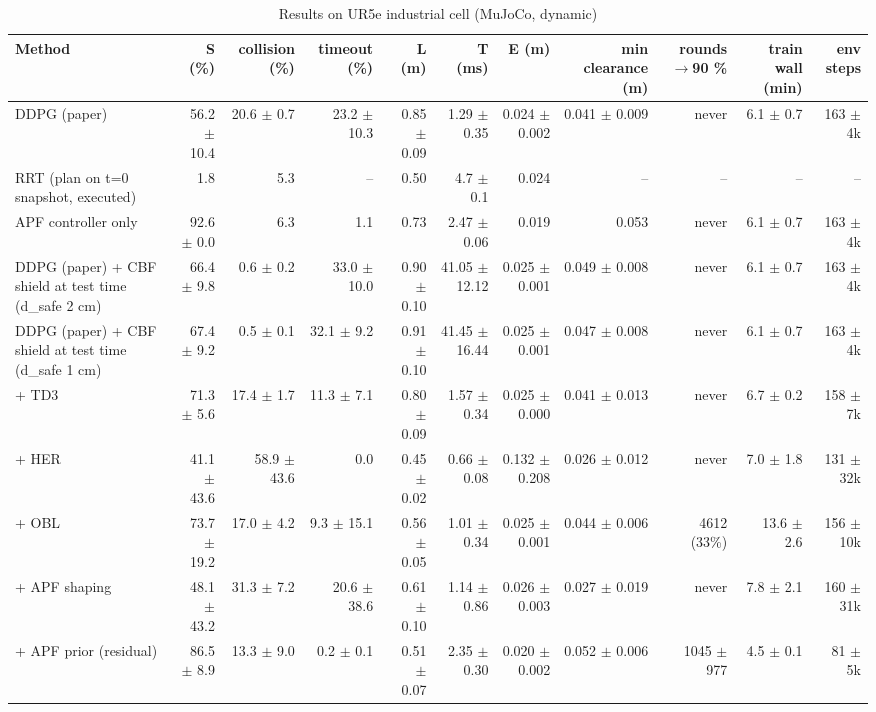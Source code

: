 \begin{table}[t]
\centering
\caption{Results on UR5e industrial cell (MuJoCo, dynamic)}
\label{tab:main_ur5e}
\small
\begin{tabular}{lrrrrrrrrrr}
\toprule
Method & S (\%) & collision (\%) & timeout (\%) & L (m) & T (ms) & E (m) & min clearance (m) & rounds$\rightarrow$90 \% & train wall (min) & env steps \\
\midrule
DDPG (paper) & 56.2 $\pm$ 10.4 & 20.6 $\pm$ 0.7 & 23.2 $\pm$ 10.3 & 0.85 $\pm$ 0.09 & 1.29 $\pm$ 0.35 & 0.024 $\pm$ 0.002 & 0.041 $\pm$ 0.009 & never & 6.1 $\pm$ 0.7 & 163 $\pm$ 4k \\
RRT (plan on t=0 snapshot, executed) & 1.8 & 5.3 & -- & 0.50 & 4.7 $\pm$ 0.1 & 0.024 & -- & -- & -- & -- \\
APF controller only & 92.6 $\pm$ 0.0 & 6.3 & 1.1 & 0.73 & 2.47 $\pm$ 0.06 & 0.019 & 0.053 & never & 6.1 $\pm$ 0.7 & 163 $\pm$ 4k \\
DDPG (paper) + CBF shield at test time (d\_safe 2 cm) & 66.4 $\pm$ 9.8 & 0.6 $\pm$ 0.2 & 33.0 $\pm$ 10.0 & 0.90 $\pm$ 0.10 & 41.05 $\pm$ 12.12 & 0.025 $\pm$ 0.001 & 0.049 $\pm$ 0.008 & never & 6.1 $\pm$ 0.7 & 163 $\pm$ 4k \\
DDPG (paper) + CBF shield at test time (d\_safe 1 cm) & 67.4 $\pm$ 9.2 & 0.5 $\pm$ 0.1 & 32.1 $\pm$ 9.2 & 0.91 $\pm$ 0.10 & 41.45 $\pm$ 16.44 & 0.025 $\pm$ 0.001 & 0.047 $\pm$ 0.008 & never & 6.1 $\pm$ 0.7 & 163 $\pm$ 4k \\
+ TD3 & 71.3 $\pm$ 5.6 & 17.4 $\pm$ 1.7 & 11.3 $\pm$ 7.1 & 0.80 $\pm$ 0.09 & 1.57 $\pm$ 0.34 & 0.025 $\pm$ 0.000 & 0.041 $\pm$ 0.013 & never & 6.7 $\pm$ 0.2 & 158 $\pm$ 7k \\
+ HER & 41.1 $\pm$ 43.6 & 58.9 $\pm$ 43.6 & 0.0 & 0.45 $\pm$ 0.02 & 0.66 $\pm$ 0.08 & 0.132 $\pm$ 0.208 & 0.026 $\pm$ 0.012 & never & 7.0 $\pm$ 1.8 & 131 $\pm$ 32k \\
+ OBL & 73.7 $\pm$ 19.2 & 17.0 $\pm$ 4.2 & 9.3 $\pm$ 15.1 & 0.56 $\pm$ 0.05 & 1.01 $\pm$ 0.34 & 0.025 $\pm$ 0.001 & 0.044 $\pm$ 0.006 & 4612 (33\%) & 13.6 $\pm$ 2.6 & 156 $\pm$ 10k \\
+ APF shaping & 48.1 $\pm$ 43.2 & 31.3 $\pm$ 7.2 & 20.6 $\pm$ 38.6 & 0.61 $\pm$ 0.10 & 1.14 $\pm$ 0.86 & 0.026 $\pm$ 0.003 & 0.027 $\pm$ 0.019 & never & 7.8 $\pm$ 2.1 & 160 $\pm$ 31k \\
+ APF prior (residual) & 86.5 $\pm$ 8.9 & 13.3 $\pm$ 9.0 & 0.2 $\pm$ 0.1 & 0.51 $\pm$ 0.07 & 2.35 $\pm$ 0.30 & 0.020 $\pm$ 0.002 & 0.052 $\pm$ 0.006 & 1045 $\pm$ 977 & 4.5 $\pm$ 0.1 & 81 $\pm$ 5k \\

\end{tabular}
\end{table}
